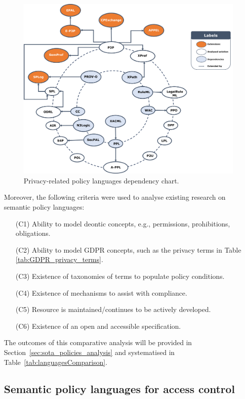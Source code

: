 \begin{figure}
    \caption{Privacy-related policy languages dependency chart.}
    \label{fig:lang-dependency-graph}
    \centering
    \includegraphics[width=\textwidth]{figures/chapter-2/languages.png}
\end{figure}

Moreover, the following criteria were used to analyse existing research on semantic policy languages:
\begin{enumerate}
    \item[(C1)] Ability to model deontic concepts, e.g., permissions, prohibitions, obligations.
    \item[(C2)] Ability to model GDPR concepts, such as the privacy terms in Table \ref{tab:GDPR_privacy_terms}.
    \item[(C3)] Existence of taxonomies of terms to populate policy conditions.
    \item[(C4)] Existence of mechanisms to assist with compliance.
    \item[(C5)] Resource is maintained/continues to be actively developed.
    \item[(C6)] Existence of an open and accessible specification.
\end{enumerate}

The outcomes of this comparative analysis will be provided in Section~\ref{sec:sota_policies_analysis} and systematised in Table~\ref{tab:languagesComparison}.

\subsection{Semantic policy languages for access control}
\label{sec:sota_policies_description}

